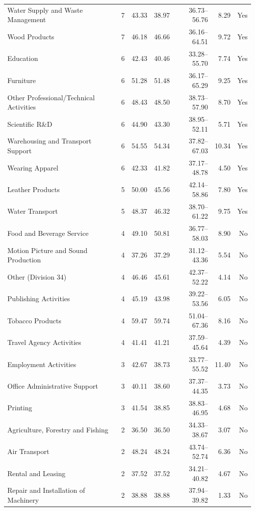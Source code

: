 {\begin{longtable}{@{}L{6.0cm}rrrrrr@{}}
Water Supply and Waste Management & 7 & 43.33 & 38.97 & 36.73--56.76 & 8.29 & Yes \\
Wood Products & 7 & 46.18 & 46.66 & 36.16--64.51 & 9.72 & Yes \\
Education & 6 & 42.43 & 40.46 & 33.28--55.70 & 7.74 & Yes \\
Furniture & 6 & 51.28 & 51.48 & 36.17--65.29 & 9.25 & Yes \\
Other Professional/Technical Activities & 6 & 48.43 & 48.50 & 38.73--57.90 & 8.70 & Yes \\
Scientific R\&D & 6 & 44.90 & 43.30 & 38.95--52.11 & 5.71 & Yes \\
Warehousing and Transport Support & 6 & 54.55 & 54.34 & 37.82--67.03 & 10.34 & Yes \\
Wearing Apparel & 6 & 42.33 & 41.82 & 37.17--48.78 & 4.50 & Yes \\
Leather Products & 5 & 50.00 & 45.56 & 42.14--58.86 & 7.80 & Yes \\
Water Transport & 5 & 48.37 & 46.32 & 38.70--61.22 & 9.75 & Yes \\
Food and Beverage Service & 4 & 49.10 & 50.81 & 36.77--58.03 & 8.90 & No \\
Motion Picture and Sound Production & 4 & 37.26 & 37.29 & 31.12--43.36 & 5.54 & No \\
Other (Division 34) & 4 & 46.46 & 45.61 & 42.37--52.22 & 4.14 & No \\
Publishing Activities & 4 & 45.19 & 43.98 & 39.22--53.56 & 6.05 & No \\
Tobacco Products & 4 & 59.47 & 59.74 & 51.04--67.36 & 8.16 & No \\
Travel Agency Activities & 4 & 41.41 & 41.21 & 37.59--45.64 & 4.39 & No \\
Employment Activities & 3 & 42.67 & 38.73 & 33.77--55.52 & 11.40 & No \\
Office Administrative Support & 3 & 40.11 & 38.60 & 37.37--44.35 & 3.73 & No \\
Printing & 3 & 41.54 & 38.85 & 38.83--46.95 & 4.68 & No \\
Agriculture, Forestry and Fishing & 2 & 36.50 & 36.50 & 34.33--38.67 & 3.07 & No \\
Air Transport & 2 & 48.24 & 48.24 & 43.74--52.74 & 6.36 & No \\
Rental and Leasing & 2 & 37.52 & 37.52 & 34.21--40.82 & 4.67 & No \\
Repair and Installation of Machinery & 2 & 38.88 & 38.88 & 37.94--39.82 & 1.33 & No \\

\end{longtable}}
